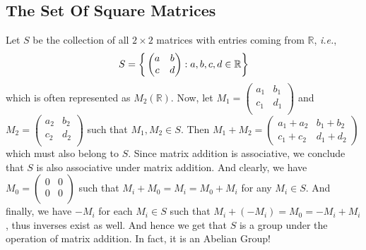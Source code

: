 
\subsection{The Set Of Square Matrices}
Let $S$ be the collection of all $2 \times 2$ matrices with entries coming from $\mathbb{R}$, \emph{i.e.}, $$S = \bigg{\{}\begin{pmatrix} a & b \\ c & d \\ \end{pmatrix}: a,b,c,d \in \mathbb{R} \bigg{\}}$$ which is often represented as $M_2(\mathbb{R})$. Now, let $M_1 = \begin{pmatrix} a_1 & b_1 \\ c_1 & d_1 \\ \end{pmatrix}$ and $M_2 = \begin{pmatrix} a_2 & b_2 \\ c_2 & d_2 \\ \end{pmatrix}$ such that $M_1, M_2 \in S$. Then $M_1 + M_2 = \begin{pmatrix} a_1 + a_2 & b_1 + b_2 \\ c_1 + c_2 & d_1 + d_2 \end{pmatrix}$ which must also belong to $S$. Since matrix addition is associative, we conclude that $S$ is also associative under matrix addition. And clearly, we have $M_0 = \begin{pmatrix} 0 & 0 \\ 0 & 0 \\ \end{pmatrix}$ such that $M_i + M_0 = M_i = M_0 + M_i$ for any $M_i \in S$. And finally, we have $-M_i$ for each $M_i \in S$ such that $M_i + (-M_i) = M_0 = -M_i + M_i$, thus inverses exist as well. And hence we get that $S$ is a group under the operation of matrix addition. In fact, it is an Abelian Group!
